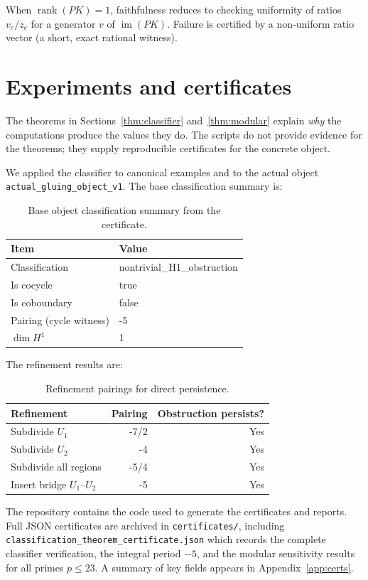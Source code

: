\documentclass[11pt]{article}
\begin{document}
When $\operatorname{rank}(PK)=1$, faithfulness reduces to checking uniformity
of ratios $v_e/z_e$ for a generator $v$ of $\operatorname{im}(PK)$.
Failure is certified by a non‑uniform ratio vector (a short, exact rational witness).

\section{Experiments and certificates}
The theorems in Sections~\ref{thm:classifier} and~\ref{thm:modular} explain
\emph{why} the computations produce the values they do. The scripts do not
provide evidence for the theorems; they supply reproducible certificates for the
concrete object.

We applied the classifier to canonical examples and to the actual object
\texttt{actual\_gluing\_object\_v1}. The base classification summary is:

\begin{table}[h]
\centering
\begin{tabular}{l l}
\toprule
Item & Value \\
\midrule
Classification & nontrivial\_H1\_obstruction \\
Is cocycle & true \\
Is coboundary & false \\
Pairing (cycle witness) & -5 \\
$\dim H^1$ & 1 \\
\bottomrule
\end{tabular}
\caption{Base object classification summary from the certificate.}
\end{table}

The refinement results are:
\begin{table}[h]
\centering
\begin{tabular}{l r r}
\toprule
Refinement & Pairing & Obstruction persists? \\
\midrule
Subdivide $U_1$ & -7/2 & Yes \\
Subdivide $U_2$ & -4 & Yes \\
Subdivide all regions & -5/4 & Yes \\
Insert bridge $U_1$--$U_2$ & -5 & Yes \\
\bottomrule
\end{tabular}
\caption{Refinement pairings for direct persistence.}
\end{table}

The repository contains the code used to generate the certificates and reports.
Full JSON certificates are archived in \texttt{certificates/}, including
\texttt{classification\_theorem\_certificate.json} which records the complete
classifier verification, the integral period $-5$, and the modular sensitivity
results for all primes $p\le 23$. A summary of key fields appears in
Appendix~\ref{app:certs}.
\end{document}
